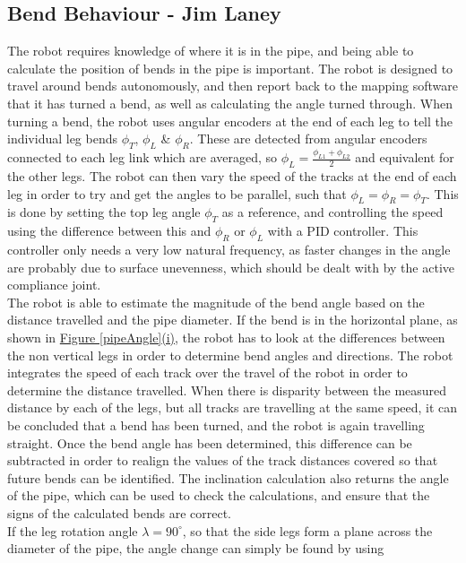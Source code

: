 \documentclass[11pt]{article}		%
\begin{document}
		\subsection[Bend Behaviour]{Bend Behaviour - Jim Laney}
		
		The robot requires knowledge of where it is in the pipe, and being able to calculate the position of bends in the pipe is important.
		The robot is designed to travel around bends autonomously, and then report back to the mapping software that it has turned a bend, as well as calculating the angle turned through.
		When turning a bend, the robot uses angular encoders at the end of each leg to tell the individual leg bends $\phi_T$, $\phi_L$ \& $\phi_R$.
		These are detected from angular encoders connected to each leg link which are averaged, so $\phi_L = \frac{\phi_{L1} + \phi_{L2}}{2}$ and equivalent for the other legs.
		The robot can then vary the speed of the tracks at the end of each leg in order to try and get the angles to be parallel, such that $\phi_L = \phi_R = \phi_T$.
		This is done by setting the top leg angle $\phi_T$ as a reference, and controlling the speed using the difference between this and $\phi_R$ or $\phi_L$ with a PID controller.
		This controller only needs a very low natural frequency, as faster changes in the angle are probably due to surface unevenness, which should be dealt with by the active compliance joint.
		\\
		The robot is able to estimate the magnitude of the bend angle based on the distance travelled and the pipe diameter.
		If the bend is in the horizontal plane, as shown in \hyperref[pipeAngle]{Figure \ref*{pipeAngle}(i)}, the robot has to look at the differences between the non vertical legs in order to determine bend angles and directions.
		The robot integrates the speed of each track over the travel of the robot in order to determine the distance travelled.
		When there is disparity between the measured distance by each of the legs, but all tracks are travelling at the same speed, it can be concluded that a bend has been turned, and the robot is again travelling straight.
		Once the bend angle has been determined, this difference can be subtracted in order to realign the values of the track distances covered so that future bends can be identified.
		The inclination calculation also returns the angle of the pipe, which can be used to check the calculations, and ensure that the signs of the calculated bends are correct.
		\\
		If the leg rotation angle $\lambda = 90^\circ$, so that the side legs form a plane across the diameter of the pipe, the angle change can simply be found by using
\end{document}
